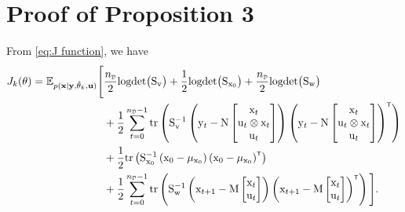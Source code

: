 \section{Proof of Proposition 3}\label{app:Stationary Point Uniqueness}
From \eqref{eq:J function}, we have
\begin{align}
        J_k(\vctheta) = \mathbb{E}_{p(\mathbf{x}|\mathbf{y},\hat{\vctheta}_k,\mathbf{u})}\Bigg[
        &\frac{\nD}{2}\logdet\big(\mxS_\vcv\big) 
        + 
        \frac{1}{2} \logdet\big(\mxS_{\vcx_0}\big)
        +
        \frac{\nD}{2}\logdet\big(\mxS_\vcw\big) 
        \\&
        +\frac{1}{2}\sum_{t=0}^{\nD-1} \trace\left(\mxS_\vcv^{-1} \left(\vcy_t - \mxN \begin{bmatrix} \vcx_t\\ \vcu_t \otimes \vcx_t \\ \vcu_t\end{bmatrix}  \right)
        \left(\vcy_t - \mxN \begin{bmatrix} \vcx_t\\ \vcu_t \otimes \vcx_t \\ \vcu_t\end{bmatrix}  \right)^\tr\right)
        \\ & 
        + \frac{1}{2}\trace\left(\mxS_{\vcx_0}^{-1} \left(\vcx_0-\vcmu_{\vcx_0}\right) \left(\vcx_0-\vcmu_{\vcx_0}\right)^\tr\right) 
        \\ &
        +\frac{1}{2}\sum_{t=0}^{\nD-1} \trace \left( \mxS_\vcw^{-1}\left(\vcx_{t+1} - \mxM \begin{bmatrix}\vcx_t\\ \vcu_t \end{bmatrix}\right)\left(\vcx_{t+1} - \mxM \begin{bmatrix}\vcx_t\\ \vcu_t \end{bmatrix}\right)^\tr\right)\Bigg].
\end{align}
